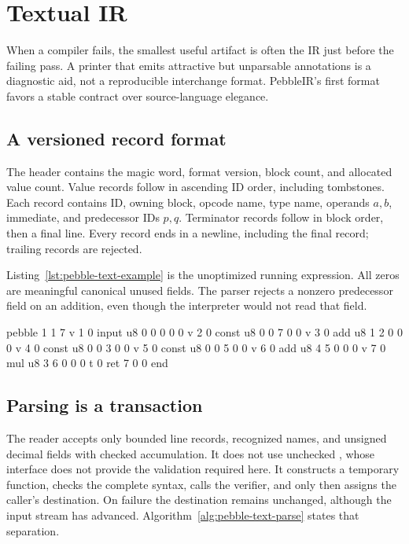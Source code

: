 \chapter{Textual IR}
\label{ch:pebble-text}

When a compiler fails, the smallest useful artifact is often the IR just before the failing pass.
A printer that emits attractive but unparsable annotations is a diagnostic aid, not a reproducible interchange format.
PebbleIR's first format favors a stable contract over source-language elegance.

\section{A versioned record format}
\label{sec:pebble-records}
The header contains the magic word, format version, block count, and allocated value count.
Value records follow in ascending ID order, including tombstones.
Each record contains ID, owning block, opcode name, type name, operands $a,b$, immediate, and predecessor IDs $p,q$.
Terminator records follow in block order, then a final  line.
Every record ends in a newline, including the final record; trailing records are rejected.

Listing~\ref{lst:pebble-text-example} is the unoptimized running expression.
All zeros are meaningful canonical unused fields.
The parser rejects a nonzero predecessor field on an addition, even though the interpreter would not read that field.

\begin{irlisting}[caption={The version-one format preserves value IDs and explicitly encodes every field.},label={lst:pebble-text-example}]
pebble 1 1 7
v 1 0 input u8 0 0 0 0 0
v 2 0 const u8 0 0 7 0 0
v 3 0 add u8 1 2 0 0 0
v 4 0 const u8 0 0 3 0 0
v 5 0 const u8 0 0 5 0 0
v 6 0 add u8 4 5 0 0 0
v 7 0 mul u8 3 6 0 0 0
t 0 ret 7 0 0
end
\end{irlisting}

\section{Parsing is a transaction}
\label{sec:pebble-parse-transaction}
The reader accepts only bounded line records, recognized names, and unsigned decimal fields with checked accumulation.
It does not use unchecked , whose interface does not provide the validation required here.
It constructs a temporary function, checks the complete syntax, calls the verifier, and only then assigns the caller's destination.
On failure the destination remains unchanged, although the input stream has advanced.
Algorithm~\ref{alg:pebble-text-parse} states that separation.

